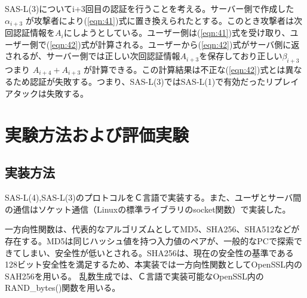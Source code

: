 \documentclass{thesis}
\begin{document}
SAS-L(3)についてi+3回目の認証を行うことを考える。サーバー側で作成した $\alpha_{i+3}$ が攻撃者により(\ref{eqn:41})式に置き換えられたとする。このとき攻撃者は次回認証情報を$A_i$にしようとしている。ユーザー側は(\ref{eqn:41})式を受け取り、ユーザー側で(\ref{eqn:42})式が計算される。ユーザーから(\ref{eqn:42})式がサーバ側に返されるが、サーバー側では正しい次回認証情報$A_{i+3}$を保存しており正しい$\beta_{i+3}$ つまり $A_{i+4}+A_{i+3}$ が計算できる。この計算結果は不正な(\ref{eqn:42})式とは異なるため認証が失敗する。つまり、SAS-L(3)ではSAS-L(1)で有効だったリプレイアタックは失敗する。


\chapter{実験方法および評価実験}

\section{実装方法}

SAS-L(4),SAS-L(3)のプロトコルをＣ言語で実装する。また、ユーザとサーバ間の通信はソケット通信（Linuxの標準ライブラリのsocket関数）で実装した。

一方向性関数は、代表的なアルゴリズムとしてMD5、SHA256、SHA512などが存在する。MD5は同じハッシュ値を持つ入力値のペアが、一般的なPCで探索できてしまい、安全性が低いとされる。SHA256は、現在の安全性の基準である128ビット安全性を満足するため、本実装では一方向性関数としてOpenSSL内のSAH256を用いる。
乱数生成では、Ｃ言語で実装可能なOpenSSL内のRAND\_bytes()関数を用いる。
\end{document}
